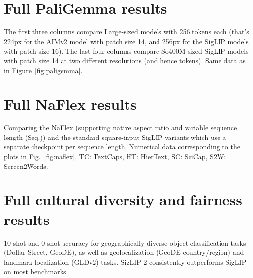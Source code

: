 \section{Full PaliGemma results}
\vspace*{\fill}
\begin{table*}[h]
  \centering
  \footnotesize
  
  \caption{The first three columns compare Large-sized models with 256 tokens each (that's 224px for the AIMv2 model with patch size 14, and 256px for the SigLIP models with patch size 16). The last four columns compare So400M-sized SigLIP models with patch size 14 at two different resolutions (and hence tokens). Same data as in Figure~\ref{fig:paligemma}.}
  \label{tbl:paligemma}
\end{table*}
\vspace*{\fill}

\clearpage

\section{Full NaFlex results}
\vspace*{\fill}
\begin{table*}[h]
  \centering
  \footnotesize
  
  \caption{Comparing the NaFlex (supporting native aspect ratio and variable sequence length (Seq.)) and the standard square-input SigLIP variants which use a separate checkpoint per sequence length. Numerical data corresponding to the plots in Fig.~\ref{fig:naflex}. TC: TextCaps, HT: HierText, SC: SciCap, S2W: Screen2Words.}
  \label{tbl:app_naflex}
\end{table*}
\vspace*{\fill}

\clearpage

\section{Full cultural diversity and fairness results}\label{app:cultural_diversity}
\vspace*{\fill}
\begin{table*}[h]
  \centering
  \footnotesize
  
  \caption{10-shot and 0-shot accuracy for geographically diverse object classification tasks (Dollar Street, GeoDE), as well as geolocalization (GeoDE country/region) and landmark localization (GLDv2) tasks. SigLIP 2 consistently outperforms SigLIP on most benchmarks.}
  \label{tbl:app_cultural_diversity}
\end{table*}
\vspace*{\fill}



